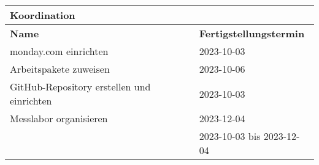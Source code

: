 \begin{table}[!ht]
	\centering
	\begin{tabular}{|l|l|}
		\hline
		\textbf{Koordination} & ~ \\ \hline
		\textbf{Name} & \textbf{Fertigstellungstermin} \\ \hline
		monday.com einrichten & 2023-10-03 \\ \hline
		Arbeitspakete zuweisen & 2023-10-06 \\ \hline
		GitHub-Repository erstellen und einrichten & 2023-10-03 \\ \hline
		Messlabor organisieren & 2023-12-04 \\ \hline
		~ & 2023-10-03 bis 2023-12-04 \\ \hline
	\end{tabular}
\end{table}

